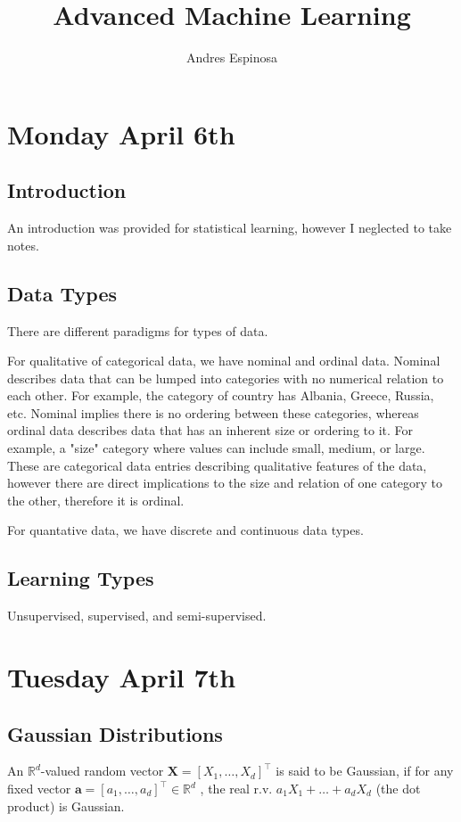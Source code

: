 \documentclass[11pt]{article}
\title{Advanced Machine Learning}
\author{Andres Espinosa}
\begin{document}
\pgfplotsset{compat=1.18}
\maketitle

\tableofcontents
\section{Monday April 6th}
\subsection{Introduction}
An introduction was provided for statistical learning, however I neglected to take notes.

\subsection{Data Types}
There are different paradigms for types of data.

For qualitative of categorical data, we have nominal and ordinal data.
Nominal describes data that can be lumped into categories with no numerical relation to each other. 
For example, the category of country has Albania, Greece, Russia, etc. 
Nominal implies there is no ordering between these categories, whereas ordinal data describes data that has an inherent size or ordering to it.
For example, a "size" category where values can include small, medium, or large.
These are categorical data entries describing qualitative features of the data, however there are direct implications to the size and relation of one category to the other, therefore it is ordinal.

For quantative data, we have discrete and continuous data types.

\subsection{Learning Types}
Unsupervised, supervised, and semi-supervised.
 
\section{Tuesday April 7th}
\subsection{Gaussian Distributions}
An $\mathbb{R}^d$-valued random vector $\textbf{X} = [X_1, \dots, X_d]^\top$ is said to be Gaussian, if for any fixed vector $\textbf{a} = [a_1, \dots, a_d]^\top \in \mathbb{R}^d$ , the real r.v. $a_1 X_1 + \dots + a_d X_d$ (the dot product) is Gaussian.
\end{document}
